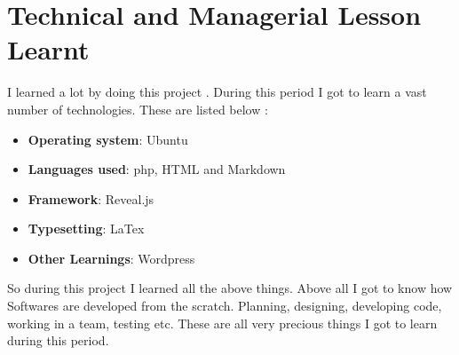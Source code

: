 
\section{Technical and Managerial Lesson Learnt}
I learned a lot by doing this project . During this period I got to learn a vast 
number of technologies. These are listed below :
\begin{itemize}
\item {\bf{Operating system}}: Ubuntu
\item {\bf{Languages used}}: php, HTML and Markdown
\item {\bf{Framework}}: Reveal.js
\item {\bf{Typesetting}}: LaTex
\item {\bf{Other Learnings}}:  Wordpress

\end{itemize}

So during this project I learned all the above things. Above all I got to know 
how Softwares are developed from the scratch. Planning, designing, developing code, 
working in a team, testing etc. These are all very precious things I got to learn 
during this period.  


